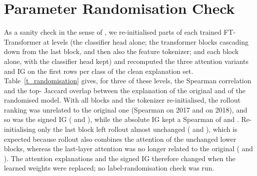 

\section{Parameter Randomisation Check}
\label{sec:rand}
As a sanity check in the sense of \cite{adebayo2018}, we re-initialised parts of each trained FT-Transformer at
\nRandLevels{} levels (the classifier head alone; the transformer blocks cascading down from the last block, and then
also the feature tokenizer; and each block alone, with the classifier head kept) and recomputed the three attention
variants and IG on the first \randRowsPerClass{} rows per class of the clean explanation set.
Table~\ref{t_randomisation} gives, for three of these levels, the Spearman correlation and the top-\paramTopK{}
Jaccard overlap between the explanation of the original and of the randomised model.
With all blocks and the tokenizer re-initialised, the rollout ranking was unrelated to the original one (Spearman
\randRolloutAllSeventeen{} on 2017 and \randRolloutAllEighteen{} on 2018), and so was the signed IG
(\randIGSignedAllSeventeen{} and \randIGSignedAllEighteen), while the absolute IG kept a Spearman of
\randIGAbsAllSeventeen{} and \randIGAbsAllEighteen.
Re-initialising only the last block left rollout almost unchanged (\randRolloutTopOneSeventeen{} and
\randRolloutTopOneEighteen), which is expected because rollout also combines the attention of the unchanged lower
blocks, whereas the last-layer attention was no longer related to the original (\randLastTopOneSeventeen{} and
\randLastTopOneEighteen).
The attention explanations and the signed IG therefore changed when the learned weights were replaced; no
label-randomisation check was run.



\FloatBarrier
